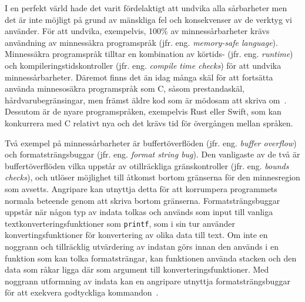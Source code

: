 I en perfekt värld hade det varit fördelaktigt att undvika alla sårbarheter men
det är inte möjligt på grund av mänskliga fel och konsekvenser av de verktyg vi
använder. För att undvika, exempelvis, 100\% av minnessårbarheter krävs
användning av minnessäkra programspråk (jfr. eng. \emph{memory-safe language}).
Minnessäkra programspråk tilltar en kombination av körtids- (jfr. eng.
\emph{runtime}) och kompileringstidskontroller (jfr. eng. \emph{compile
    time checks}) för att undvika minnessårbarheter. Däremot finns det än idag
många skäl för att fortsätta använda minnesosäkra programspråk som C, såsom
prestandaskäl, hårdvarubegränsingar, men främst äldre kod som är mödosam att
skriva om~\cite{computer_security_cs161}. Dessutom är de nyare programspråken,
exempelvis Rust eller Swift, som kan konkurrera med C relativt nya och det
krävs tid för övergången mellan språken.

Två exempel på minnessårbarheter är buffertöverflöden (jfr. eng. \emph{buffer
    overflow}) och formatsträngsbuggar (jfr. eng. \emph{format string bug}). Den
vanligaste av de två är buffertöverflöden vilka uppstår av otillräckliga
gränskontroller (jfr. eng. \emph{bounds checks}), och utlöser möjlighet till åtkomst bortom
gränserna för den minnesregion som avsetts. Angripare kan utnyttja detta för att korrumpera programmets
normala beteende genom att skriva bortom gränserna. Formatsträngsbuggar uppstår
när någon typ av indata tolkas och används som input till vanliga
textkonverteringsfunktioner som \texttt{printf}, som i sin tur använder
konvertingsfunktioner för konvertering av olika data till text. Om inte en
noggrann och tillräcklig utvärdering av indatan görs innan den används i en
funktion som kan tolka formatsträngar, kan funktionen använda stacken och den
data som råkar ligga där som argument till konverteringsfunktioner. Med noggrann
utformning av indata kan en angripare utnyttja formatsträngsbuggar för att
exekvera godtyckliga kommandon~\cite{computer_security_cs161}.




